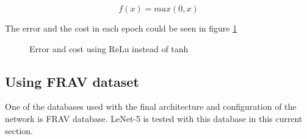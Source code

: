 \begin{equation}
f(x) = max(0,x)
\label{Relu-formula}
\end{equation}

The error and the cost in each epoch could be seen in figure \ref{fig:LENET_relu}

\begin{figure}[htb]
\centering

\caption{Error and cost using ReLu instead of tanh}
\label{fig:LENET_relu}
\end{figure}

\subsection{Using FRAV dataset}
One of the databases used with the final architecture and configuration of the network is FRAV database. LeNet-5 is tested with this database in this current section.\\

